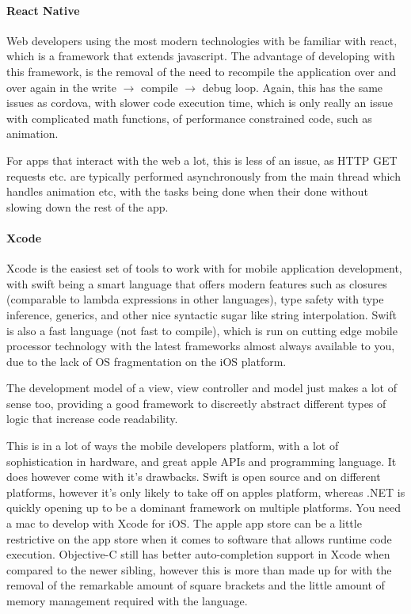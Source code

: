 \documentclass{scrreprt}
\begin{document}
\paragraph{React Native}

Web developers using the most modern technologies with be familiar with react, which is a framework that extends javascript. The advantage of developing with this framework, is the removal of the need to recompile the application over and over again in the write $\rightarrow$ compile $\rightarrow$ debug loop. Again, this has the same issues as cordova, with slower code execution time, which is only really an issue with complicated math functions, of performance constrained code, such as animation.

For apps that interact with the web a lot, this is less of an issue, as HTTP GET requests etc. are typically performed asynchronously from the main thread which handles animation etc, with the tasks being done when their done without slowing down the rest of the app.

\paragraph{Xcode}

Xcode is the easiest set of tools to work with for mobile application development, with swift being a smart language that offers modern features such as closures (comparable to lambda expressions in other languages), type safety with type inference, generics, and other nice syntactic sugar like string interpolation. Swift is also a fast language (not fast to compile), which is run on cutting edge mobile processor technology with the latest frameworks almost always available to you, due to the lack of OS fragmentation on the iOS platform.

The development model of a view, view controller and model just makes a lot of sense too, providing a good framework to discreetly abstract different types of logic that increase code readability.

This is in a lot of ways the mobile developers platform, with a lot of sophistication in hardware, and great apple APIs and programming language. It does however come with it's drawbacks. Swift is open source and on different platforms, however it's only likely to take off on apples platform, whereas .NET is quickly opening up to be a dominant framework on multiple platforms. You need a mac to develop with Xcode for iOS. The apple app store can be a little restrictive on the app store when it comes to software that allows runtime code execution. Objective-C still has better auto-completion support in Xcode when compared to the newer sibling, however this is more than made up for with the removal of the remarkable amount of square brackets and the little amount of memory management required with the language.
\end{document}
